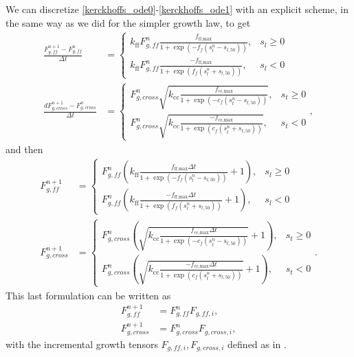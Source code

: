 \documentclass[a4paper,10pt]{article}
\begin{document}
We can discretize \eqref{kerckhoffs_ode0}-\eqref{kerckhoffs_ode1} with an explicit scheme, in the same way as we did for the
simpler growth law, to get
\begin{align}
  \frac{F_{g,ff}^{n+1} - F_{g,ff}^{n}}{\Delta t} &= \begin{cases}
    k_\text{ff} F_{g,ff}^n \frac{f_\text{ff,max} }{1 + \exp(-f_f(s_l^n - s_{l,50}))}, & s_l \geq 0 \\
    k_\text{ff} F_{g,ff}^n \frac{-f_\text{ff,max} }{1 + \exp(f_f(s_l^n + s_{l,50}))}, & s_l < 0
    \end{cases} \label{kerckhoffs_disc0}\\
    \frac{d F_{g,cross}^{n+1}- F_{g,cross}^n}{\Delta t} &=
\begin{cases}
  F_{g,cross}^n \sqrt{k_\text{cc} \frac{f_\text{cc,max}  }{1 + \exp(-c_f(s_t^n - s_{t,50}))}}, & s_t \geq 0 \\
  F_{g,cross}^n \sqrt{k_\text{cc} \frac{-f_\text{cc,max} }{1 + \exp(c_f(s_t^n + s_{t,50}))}}, & s_t < 0
\end{cases}, \label{kerckhoffs_disc1}
\end{align}
and then
\begin{align}
  F_{g,ff}^{n+1} &= \begin{cases}
    F_{g,ff}^n (k_\text{ff} \frac{f_\text{ff,max} \Delta t}{1 + \exp(-f_f(s_l^n - s_{l,50}))} + 1), & s_l \geq 0 \\
    F_{g,ff}^n (k_\text{ff} \frac{-f_\text{ff,max} \Delta t}{1 + \exp(f_f(s_l^n + s_{l,50}))} + 1), & s_l < 0
    \end{cases} \label{kerckhoffs_inc0}\\
    F_{g,cross}^{n+1} &=
\begin{cases}
  F_{g,cross}^n (\sqrt{k_\text{cc} \frac{f_\text{cc,max} \Delta t }{1 + \exp(-c_f(s_t^n - s_{t,50}))}}+1), & s_t \geq 0 \\
  F_{g,cross}^n (\sqrt{k_\text{cc}\frac{-f_\text{cc,max}\Delta t }{1 + \exp(c_f(s_t^n + s_{t,50}))}}+ 1), & s_t < 0
\end{cases}. \label{kerckhoffs_inc1}
\end{align}
This last formulation can be written as
\begin{align}
  F_{g,ff}^{n+1} &= F_{g,ff}^n F_{g,ff,i},\\
  F_{g,cross}^{n+1} &= F_{g,cross}^n F_{g,cross,i},
\end{align}
with the incremental growth tensors $F_{g,ff,i}, F_{g,cross,i}$ defined as in \cite{Kerckhoffs2012MRC}. 



\end{document}
